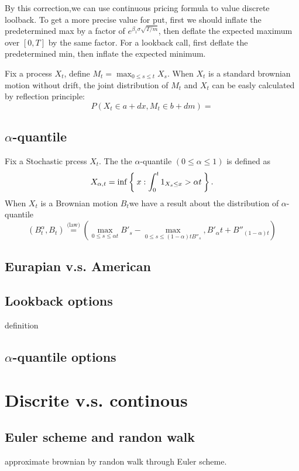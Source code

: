 \documentclass[11pt]{book}
\begin{document}
By this correction,we can use continuous pricing formula
to value discrete loolback. To get a more precise value for put,
first we should inflate the predetermined max by a factor of
$e^{\beta_1 \sigma \sqrt{T/m}}$,
then deflate the expected maximum over $[0,T]$ by the same factor. For a lookback call, first deflate the predetermined min, then inflate the expected minimum. 




Fix a process $X_t$, define $M_t = \max_{0\leq s\leq t} X_s$. 
When $X_t$ is a standard brownian motion without drift, 
the joint distribution of $M_t$ and $X_t$ can be easly calculated by reflection principle\cite{Karatzas91}:
\[ 
P(X_t \in a+dx, M_t \in b+dm) =  
\]

\subsection{$\alpha$-quantile}
Fix a Stochastic prcess $X_t$.
The the $\alpha$-quantile $( 0 \leq \alpha \leq 1)$ 
is defined as 
\[
X_{\alpha,t} = \inf\Set{x:\int_0^t 1_{X_s\leq x} > \alpha t}.
\]
When $X_{t}$ is a Brownian motion $B_t$we have a result about the distribution
of $\alpha$-quantile\cite{Dassios2005}
\[
(B_t^\alpha, B_t) \stackrel{\text{(law)}}{=}
 (\max_{0\leq s\leq \alpha t} B'_s-\max_{0\leq s\leq (1-\alpha)t B''_s},
 B'_\alpha t + B''_{(1-\alpha) t})
\]




\subsection{Eurapian v.s. American} 


\subsection{Lookback options}
definition

\subsection{$\alpha$-quantile options}

\section{Discrite v.s. continous}
\subsection{Euler scheme and randon walk}
approximate brownian by randon walk through Euler scheme.
\end{document}
